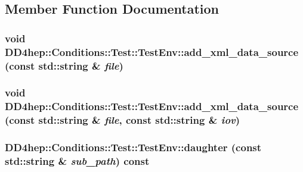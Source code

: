 \subsection{Member Function Documentation}
\hypertarget{struct_d_d4hep_1_1_conditions_1_1_test_1_1_test_env_acad16b889cd6bbf38177f59e34ec8631}{
\subsubsection[{add\_\-xml\_\-data\_\-source}]{\setlength{\rightskip}{0pt plus 5cm}void DD4hep::Conditions::Test::TestEnv::add\_\-xml\_\-data\_\-source (const std::string \& {\em file})}}
\label{struct_d_d4hep_1_1_conditions_1_1_test_1_1_test_env_acad16b889cd6bbf38177f59e34ec8631}
\hypertarget{struct_d_d4hep_1_1_conditions_1_1_test_1_1_test_env_a502ec490ea22819cd94e4c57687b161e}{
\subsubsection[{add\_\-xml\_\-data\_\-source}]{\setlength{\rightskip}{0pt plus 5cm}void DD4hep::Conditions::Test::TestEnv::add\_\-xml\_\-data\_\-source (const std::string \& {\em file}, \/  const std::string \& {\em iov})}}
\label{struct_d_d4hep_1_1_conditions_1_1_test_1_1_test_env_a502ec490ea22819cd94e4c57687b161e}
\hypertarget{struct_d_d4hep_1_1_conditions_1_1_test_1_1_test_env_a5d42d61e9a0f17ff2ef13bf7f617d27e}{
\subsubsection[{daughter}]{ DD4hep::Conditions::Test::TestEnv::daughter (const std::string \& {\em sub\_\-path}) const}}
\label{struct_d_d4hep_1_1_conditions_1_1_test_1_1_test_env_a5d42d61e9a0f17ff2ef13bf7f617d27e}


